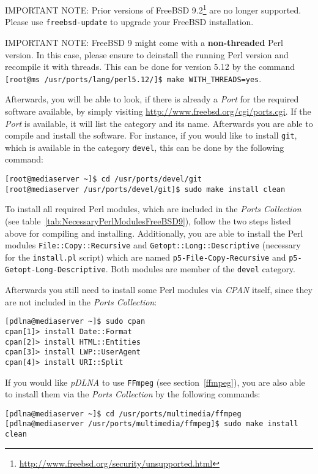 \begin{colframeimportantnote}
\textsc{IMPORTANT NOTE:} Prior versions of FreeBSD 9.2\footnote{\url{http://www.freebsd.org/security/unsupported.html}} are no longer supported. Please use \verb|freebsd-update| to upgrade your FreeBSD installation.
\end{colframeimportantnote}

\begin{colframeimportantnote}
\textsc{IMPORTANT NOTE:} FreeBSD 9 might come with a \textbf{non-threaded} Perl version. In this case, please ensure to deinstall the running Perl version and recompile it with threads. This can be done for version 5.12 by the command \verb|[root@ms /usr/ports/lang/perl5.12/]$ make WITH_THREADS=yes|.
\end{colframeimportantnote}

Afterwards, you will be able to look, if there is already a {\em Port} for the required software available, by simply visiting \url{http://www.freebsd.org/cgi/ports.cgi}. If the {\em Port} is available, it will list the category and its name. Afterwards you are able to compile and install the software. For instance, if you would like to install \verb|git|, which is available in the category \verb|devel|, this can be done by the following command:
\begin{lstlisting}
[root@mediaserver ~]$ cd /usr/ports/devel/git
[root@mediaserver /usr/ports/devel/git]$ sudo make install clean
\end{lstlisting}

To install all required Perl modules, which are included in the {\em Ports Collection} (see table~\ref{tab:NecessaryPerlModulesFreeBSD9}), follow the two steps listed above for compiling and installing. Additionally, you are able to install the Perl modules \verb|File::Copy::Recursive| and \verb|Getopt::Long::Descriptive| (necessary for the \verb|install.pl| script) which are named \verb|p5-File-Copy-Recursive| and \verb|p5-Getopt-Long-Descriptive|. Both modules are member of the \verb|devel| category.

Afterwards you still need to install some Perl modules via {\em CPAN} itself, since they are not included in the {\em Ports Collection}:
\begin{lstlisting}
[pdlna@mediaserver ~]$ sudo cpan
cpan[1]> install Date::Format
cpan[2]> install HTML::Entities
cpan[3]> install LWP::UserAgent
cpan[4]> install URI::Split
\end{lstlisting}

If you would like {\em pDLNA} to use \verb|FFmpeg| (see section~\ref{ffmpeg}), you are also able to install them via the {\em Ports Collection} by the following commands:
\begin{lstlisting}
[pdlna@mediaserver ~]$ cd /usr/ports/multimedia/ffmpeg
[pdlna@mediaserver /usr/ports/multimedia/ffmpeg]$ sudo make install clean
\end{lstlisting}


